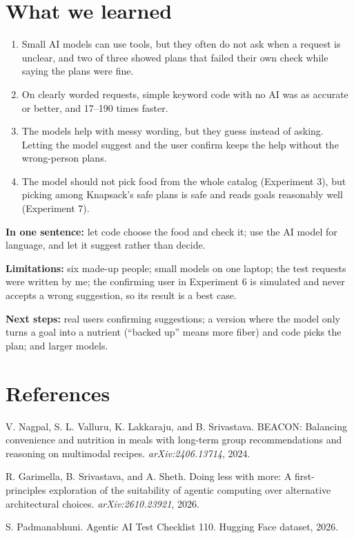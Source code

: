 \documentclass[11pt]{article}
\begin{document}
\section{What we learned}

\begin{enumerate}
  \item Small AI models can use tools, but they often do not ask when a request
        is unclear, and two of three showed plans that failed their own check
        while saying the plans were fine.
  \item On clearly worded requests, simple keyword code with no AI was as
        accurate or better, and 17--190 times faster.
  \item The models help with messy wording, but they guess instead of asking.
        Letting the model suggest and the user confirm keeps the help without
        the wrong-person plans.
  \item The model should not pick food from the whole catalog (Experiment 3),
        but picking among Knapsack's safe plans is safe and reads goals
        reasonably well (Experiment 7).
\end{enumerate}

\textbf{In one sentence:} let code choose the food and check it; use the AI
model for language, and let it suggest rather than decide.

\textbf{Limitations:} six made-up people; small models on one laptop; the test
requests were written by me; the confirming user in Experiment 6 is simulated and
never accepts a wrong suggestion, so its result is a best case.

\textbf{Next steps:} real users confirming suggestions; a version where the model
only turns a goal into a nutrient (``backed up'' means more fiber) and code picks
the plan; and larger models.

\section*{References}
\begin{enumerate}[label={[\arabic*]}, leftmargin=2.2em]
  \item V. Nagpal, S. L. Valluru, K. Lakkaraju, and B. Srivastava. BEACON:
        Balancing convenience and nutrition in meals with long-term group
        recommendations and reasoning on multimodal recipes.
        \emph{arXiv:2406.13714}, 2024.
  \item R. Garimella, B. Srivastava, and A. Sheth. Doing less with more: A
        first-principles exploration of the suitability of agentic computing
        over alternative architectural choices. \emph{arXiv:2610.23921}, 2026.
  \item S. Padmanabhuni. Agentic AI Test Checklist 110. Hugging Face dataset,
        2026.
\end{enumerate}
\end{document}
